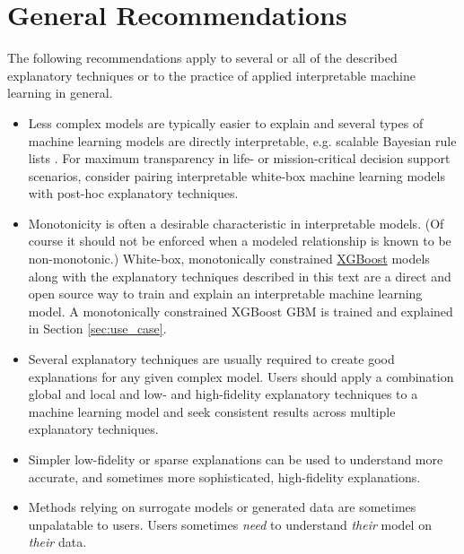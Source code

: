 \documentclass[sigconf, review]{acmart}
\begin{document}
\section{General Recommendations} \label{sec:gen_rec}

The following recommendations apply to several or all of the described explanatory techniques or to the practice of applied interpretable machine learning in general.

\begin{itemize}	
	
	\item Less complex models are typically easier to explain and several types of machine learning models are directly interpretable, e.g. scalable Bayesian rule lists \cite{sbrl}. For maximum transparency in life- or mission-critical decision support scenarios, consider pairing interpretable white-box machine learning models with post-hoc explanatory techniques.\\
	
	\item Monotonicity is often a desirable characteristic in interpretable models. (Of course it should not be enforced when a modeled relationship is known to be non-monotonic.) White-box, monotonically constrained \href{https://github.com/dmlc/xgboost}{XGBoost} models along with the explanatory techniques described in this text are a direct and open source way to train and explain an interpretable machine learning model. A monotonically constrained XGBoost GBM is trained and explained in Section \ref{sec:use_case}.\\
	
	\item Several explanatory techniques are usually required to create good explanations for any given complex model. Users should apply a combination global and local and low- and high-fidelity explanatory techniques to a machine learning model and seek consistent results across multiple explanatory techniques. \\
	
	\item Simpler low-fidelity or sparse explanations can be used to understand more accurate, and sometimes more sophisticated, high-fidelity explanations. \\ 

	\item Methods relying on surrogate models or generated data are sometimes unpalatable to users. Users sometimes \textit{need} to understand \textit{their} model on \textit{their} data.\\
	

\end{itemize}
\end{document}
